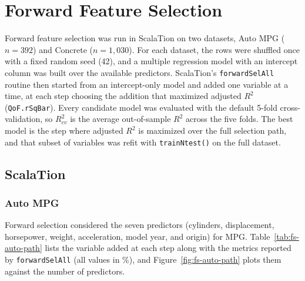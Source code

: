 
\section{Forward Feature Selection}

Forward feature selection was run in ScalaTion on two datasets, Auto MPG ($n = 392$) and Concrete ($n = 1{,}030$). For each dataset, the rows were shuffled once with a fixed random seed (42), and a multiple regression model with an intercept column was built over the available predictors. ScalaTion's \texttt{forwardSelAll} routine then started from an intercept-only model and added one variable at a time, at each step choosing the addition that maximized adjusted $R^2$ (\texttt{QoF.rSqBar}). Every candidate model was evaluated with the default 5-fold cross-validation, so $R^2_{cv}$ is the average out-of-sample $R^2$ across the five folds. The best model is the step where adjusted $R^2$ is maximized over the full selection path, and that subset of variables was refit with \texttt{trainNtest()} on the full dataset.

\subsection{ScalaTion}

\subsubsection{Auto MPG}

Forward selection considered the seven predictors (cylinders, displacement, horsepower, weight, acceleration, model year, and origin) for MPG. Table~\ref{tab:fs-auto-path} lists the variable added at each step along with the metrics reported by \texttt{forwardSelAll} (all values in \%), and Figure~\ref{fig:fs-auto-path} plots them against the number of predictors.

